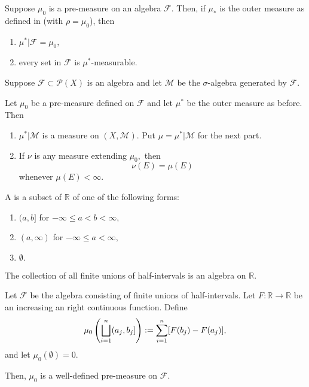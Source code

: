 \documentclass[12pt]{article}	%
\begin{document}
\begin{prop}
	Suppose $\mu_0$ is a pre-measure on an algebra $\mathcal{F}.$ Then, if $\mu_*$ is the outer measure as defined in  (with $\rho = \mu_0$), then
	\begin{enumerate}
		\item $\mu^*|\mathcal{F} = \mu_0,$
		\item every set in $\mathcal{F}$ is $\mu^*$-measurable.
	\end{enumerate}
\end{prop}

\begin{thm}
	Suppose $\mathcal{F} \subset \mathcal{P}(X)$ is an algebra and let $\mathcal{M}$ be the $\sigma$-algebra generated by $\mathcal{F}.$

	Let $\mu_0$ be a pre-measure defined on $\mathcal{F}$ and let $\mu^*$ be the outer measure as before. Then
	\begin{enumerate}
		\item $\mu^*|\mathcal{M}$ is a measure on $(X, \mathcal{M}).$ Put $\mu = \mu^*|\mathcal{M}$ for the next part.
		\item If $\nu$ is any measure extending $\mu_0,$ then
		\begin{equation*} 
			\nu(E) = \mu(E)
		\end{equation*}
		whenever $\mu(E) < \infty.$
	\end{enumerate}
\end{thm}

\begin{defn}
	A  is a subset of $\mathbb{R}$ of one of the following forms:
	\begin{enumerate}
		\item $(a, b]$ for $-\infty \le a < b < \infty,$ 
		\item $(a, \infty)$ for $-\infty \le a < \infty,$
		\item $\emptyset.$
	\end{enumerate}
\end{defn}

\begin{prop}
	The collection of all finite unions of half-intervals is an algebra on $\mathbb{R}.$
\end{prop}

\begin{prop} 
	Let $\mathcal{F}$ be the algebra consisting of finite unions of half-intervals. Let $F : \mathbb{R} \to \mathbb{R}$ be an increasing an right continuous function. Define
	\begin{equation*} 
		\mu_0\left(\bigsqcup_{i = 1}^n (a_j, b_j]\right) \vcentcolon= \sum_{i = 1}^{n} [F(b_j) - F(a_j)],
	\end{equation*}
	and let $\mu_0(\emptyset) = 0.$
	
	Then, $\mu_0$ is a well-defined pre-measure on $\mathcal{F}.$
\end{prop}
\end{document}
